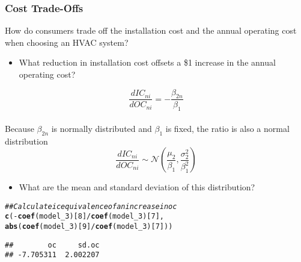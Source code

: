 \documentclass{beamer}\usepackage[]{graphicx}\usepackage[]{color}
\makeatletter
\newcommand{\hlnum}[1]{\textcolor[rgb]{0.686,0.059,0.569}{#1}}%
\newcommand{\hlcom}[1]{\textcolor[rgb]{0.678,0.584,0.686}{\textit{#1}}}%
\newcommand{\hlopt}[1]{\textcolor[rgb]{0,0,0}{#1}}%
\newcommand{\hlstd}[1]{\textcolor[rgb]{0.345,0.345,0.345}{#1}}%
\newcommand{\hlkwd}[1]{\textcolor[rgb]{0.737,0.353,0.396}{\textbf{#1}}}%
\newenvironment{kframe}{%
 \def\at@end@of@kframe{}%
 \ifinner\ifhmode%
  \def\at@end@of@kframe{\end{minipage}}%
  \begin{minipage}{\columnwidth}%
 \fi\fi%
 \def\FrameCommand##1{\hskip\@totalleftmargin \hskip-\fboxsep
 \colorbox{shadecolor}{##1}\hskip-\fboxsep
     \hskip-\linewidth \hskip-\@totalleftmargin \hskip\columnwidth}%
 \MakeFramed {\advance\hsize-\width
   \@totalleftmargin\z@ \linewidth\hsize
   \@setminipage}}%
 {\par\unskip\endMakeFramed%
 \at@end@of@kframe}
\newenvironment{knitrout}{}{} %
\makeatother
\begin{document}
\begin{frame}[fragile]\frametitle{Cost Trade-Offs}
    How do consumers trade off the installation cost and the annual operating cost when choosing an HVAC system?
    \begin{itemize}
        \item What reduction in installation cost offsets a \$1 increase in the annual operating cost?
    \end{itemize}
    $$\frac{dIC_{ni}}{dOC_{ni}} = -\frac{\beta_{2n}}{\beta_1}$$ \\
    Because $\beta_{2n}$ is normally distributed and  $\beta_1$ is fixed, the ratio is also a normal distribution
    $$\frac{dIC_{ni}}{dOC_{ni}} \sim \mathcal{N} \left( \frac{\mu_2}{\beta_1}, \frac{\sigma_2^2}{\beta_1^2} \right)$$
    \begin{itemize}
    	\item What are the mean and standard deviation of this distribution?
    \end{itemize}
\begin{knitrout}\footnotesize
{}\color{fgcolor}\begin{kframe}
\begin{alltt}
\hlcom{## Calculate ic equivalence of an increase in oc}
\hlkwd{c}\hlstd{(}\hlopt{-}\hlkwd{coef}\hlstd{(model_3)[}\hlnum{8}\hlstd{]} \hlopt{/} \hlkwd{coef}\hlstd{(model_3)[}\hlnum{7}\hlstd{],}
  \hlkwd{abs}\hlstd{(}\hlkwd{coef}\hlstd{(model_3)[}\hlnum{9}\hlstd{]} \hlopt{/} \hlkwd{coef}\hlstd{(model_3)[}\hlnum{7}\hlstd{]))}
\end{alltt}
\begin{verbatim}
##        oc     sd.oc 
## -7.705311  2.002207
\end{verbatim}
\end{kframe}
\end{knitrout}
\end{frame}
\end{document}
